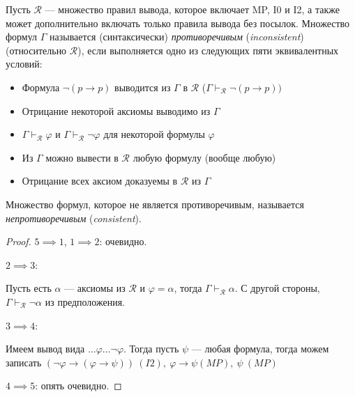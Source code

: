 \documentclass[12pt]{article}
\let\im\rightarrow
\let\n\neg
\theoremstyle{definition}
\theoremstyle{statement}
\theoremstyle{theorem}
\begin{document}
Пусть $\mathcal{R}$ --- множество правил вывода, которое включает MP,
I0 и I2, а также может дополнительно включать только правила вывода
без посылок. Множество формул $\Gamma$ называется (синтаксически)
\textit{противоречивым} (\textit{inconsistent}) (относительно
$\mathcal{R}$), если
выполняется одно из следующих пяти эквивалентных условий:
\begin{itemize}
  \item Формула $\n(p \im p)$ выводится из $\Gamma$ в $\mathcal{R}$
    ($\Gamma \vdash_{\mathcal{R}} \n (p \im p))$

  \item Отрицание некоторой аксиомы выводимо из $\Gamma$

  \item $\Gamma \vdash_{\mathcal{R}} \varphi$ и $\Gamma
    \vdash_{\mathcal{R}} \n \varphi$ для некоторой формулы $\varphi$

  \item Из $\Gamma$ можно вывести в $\mathcal{R}$ любую формулу (вообще любую)

  \item Отрицание всех аксиом доказуемы в $\mathcal{R}$ из $\Gamma$
\end{itemize}

Множество формул, которое не является противоречивым, называется
\textit{непротиворечивым} (\textit{consistent}).

\begin{proof}
  $5 \implies 1$, $1 \implies 2$: очевидно.

  $2 \implies 3$:

  Пусть есть $\alpha$ --- аксиомы из $\mathcal{R}$ и $\varphi =
  \alpha$, тогда $\Gamma \vdash_{\mathcal{R}} \alpha$. С другой
  стороны, $\Gamma \vdash_{\mathcal{R}} \n \alpha$ из предположения.

  $3 \implies 4$:

  Имеем вывод вида $\dots \varphi \dots \n \varphi$. Тогда пусть
  $\psi$ --- любая формула, тогда можем записать $(\n \varphi
  \im (\varphi \im \psi))\ (I2),\ \varphi \im \psi (MP),\ \psi\ (MP)$

  $4 \implies 5$: опять очевидно.
\end{proof}
\end{document}
